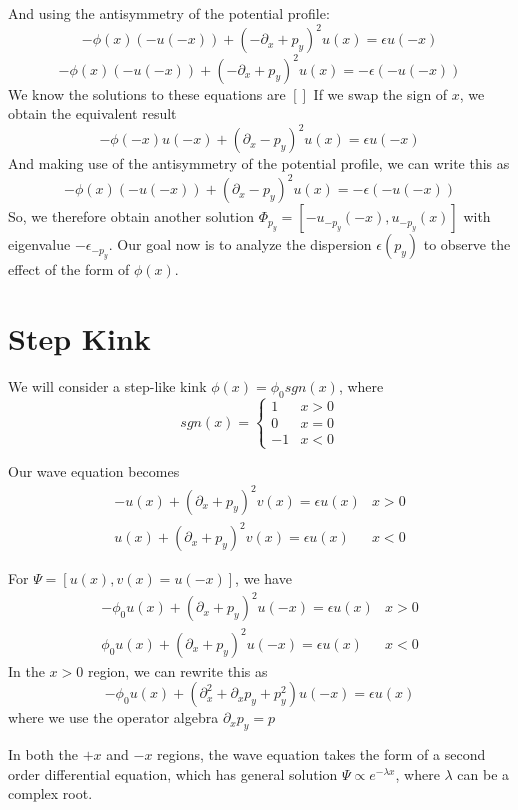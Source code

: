 \documentclass{article}
\begin{document}
And using the antisymmetry of the potential profile:
$$
-\phi(x)(-u(-x)) + (-\partial_{x} + p_{y})^{2}u(x) = \epsilon u(-x)
$$
$$
-\phi(x)(-u(-x)) + (-\partial_{x} + p_{y})^{2}u(x) = -\epsilon(-u(-x))
$$
We know the solutions to these equations are $[]$
If we swap the sign of $x$, we obtain the equivalent result
$$
-\phi(-x)u(-x) + (\partial_{x} - p_{y})^{2}u(x) = \epsilon u(-x)
$$
And making use of the antisymmetry of the potential profile, we can write this as
$$
-\phi(x)(-u(-x)) + (\partial_{x} - p_{y})^{2}u(x) = -\epsilon(-u(-x))
$$
So, we therefore obtain another solution $\Phi_{p_{y}} = [-u_{-p_{y}}(-x), u_{-p_{y}}(x)]$ with
eigenvalue $-\epsilon_{-p_{y}}$. Our goal now is to analyze the dispersion $\epsilon(p_{y})$ to
observe the effect of the form of $\phi(x)$.

\section{Step Kink}
We will consider a step-like kink $\phi(x) = \phi_{0}sgn(x)$, where
\begin{equation}
sgn(x) = \left\{\begin{matrix}
 1& x > 0\\
 0& x = 0\\
 -1 & x < 0
\end{matrix}\right.
\end{equation}

Our wave equation becomes
\begin{equation}
\begin{matrix}
-u(x) + (\partial_{x} + p_{y})^{2}v(x) = \epsilon u(x) & x > 0\\
u(x) + (\partial_{x} + p_{y})^{2}v(x) = \epsilon u(x) & x < 0
\end{matrix}
\end{equation}

For $\Psi = [u(x), v(x) = u(-x)]$, we have
\begin{equation}
\begin{matrix}
-\phi_{0}u(x) + (\partial_{x} + p_{y})^{2}u(-x) = \epsilon u(x) & x > 0\\
\phi_{0}u(x) + (\partial_{x} + p_{y})^{2}u(-x) = \epsilon u(x) & x < 0
\end{matrix}
\end{equation}
In the $x > 0$ region, we can rewrite this as
\begin{equation}
-\phi_{0}u(x) + (\partial_{x}^{2} + \partial_{x}p_{y} + p_{y}^{2})u(-x) = \epsilon u(x)
\end{equation}
where we use the operator algebra $\partial_{x}p_{y} = p_{}$

In both the $+x$ and $-x$ regions, the wave equation takes the form of a second order differential equation,
which has general solution $\Psi \propto e^{-\lambda x}$, where $\lambda$ can be a complex root.
\end{document}
